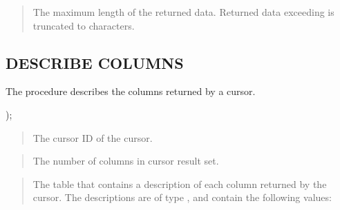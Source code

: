 \documentclass[letterpaper,10pt,english,openany,oneside]{sphinxmanual}
\begin{document}
\begin{quote}

The maximum length of the returned data. Returned data exceeding
 is truncated to  characters.
\end{quote}

\newpage


\subsection{DESCRIBE COLUMNS}
\label{\detokenize{describe_columns::doc}}\label{\detokenize{describe_columns:describe-columns}}
The  procedure describes the columns returned by a
cursor.

\begin{DUlineblock}{0em}
\item[] 
\item[] );
\end{DUlineblock}


\begin{quote}

The cursor ID of the cursor.
\end{quote}

\begin{quote}

The number of columns in cursor result set.
\end{quote}

\begin{quote}

The table that contains a description of each column returned by the
cursor. The descriptions are of type , and contain the
following values:
\end{quote}
\end{document}
